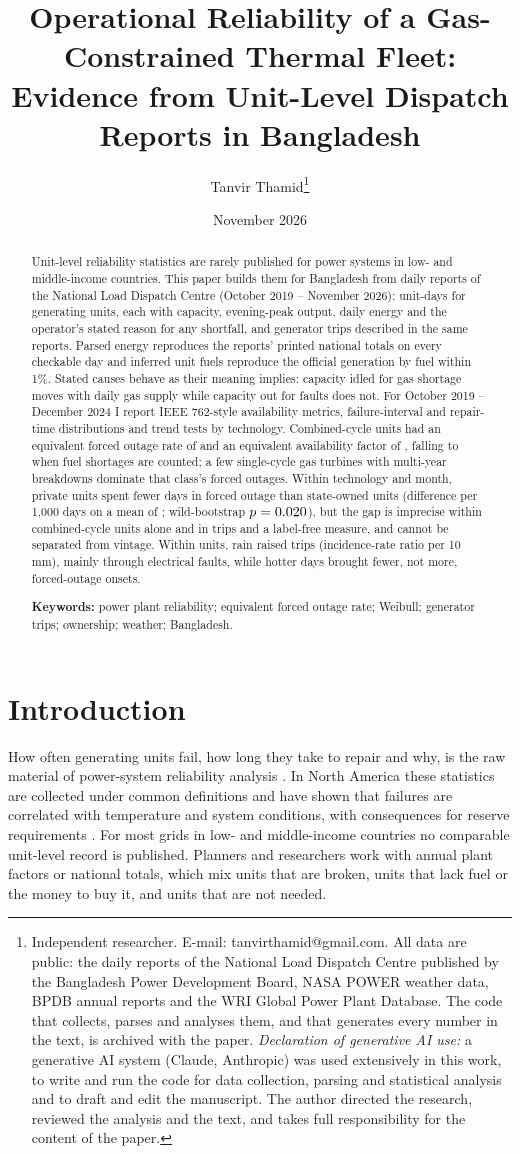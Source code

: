 \documentclass[11pt]{article}
\title{\textbf{Operational Reliability of a Gas-Constrained Thermal Fleet:\\ Evidence from Unit-Level Dispatch Reports in Bangladesh}}
\author{Tanvir Thamid\thanks{Independent researcher. E-mail: tanvirthamid@gmail.com. All data are public: the daily reports of the National Load Dispatch Centre published by the Bangladesh Power Development Board, NASA POWER weather data, BPDB annual reports and the WRI Global Power Plant Database. The code that collects, parses and analyses them, and that generates every number in the text, is archived with the paper. \emph{Declaration of generative AI use:} a generative AI system (Claude, Anthropic) was used extensively in this work, to write and run the code for data collection, parsing and statistical analysis and to draft and edit the manuscript. The author directed the research, reviewed the analysis and the text, and takes full responsibility for the content of the paper.}}
\date{November 2026}
\begin{document}
\maketitle
\begin{abstract}
\noindent Unit-level reliability statistics are rarely published for power systems in low- and middle-income countries. This paper builds them for Bangladesh from \nDays{} daily reports of the National Load Dispatch Centre (October 2019 -- November 2026): \nUnitDays{} unit-days for \nUnits{} generating units, each with capacity, evening-peak output, daily energy and the operator's stated reason for any shortfall, and \nTrips{} generator trips described in the same reports. Parsed energy reproduces the reports' printed national totals on every checkable day and inferred unit fuels reproduce the official generation by fuel within 1\%. Stated causes behave as their meaning implies: capacity idled for gas shortage moves with daily gas supply while capacity out for faults does not. For October 2019 -- December 2024 I report IEEE 762-style availability metrics, failure-interval and repair-time distributions and trend tests by technology. Combined-cycle units had an equivalent forced outage rate of \ieeeCcEFOR{} and an equivalent availability factor of \ieeeCcEAF, falling to \ieeeCcEAFomc{} when fuel shortages are counted; a few single-cycle gas turbines with multi-year breakdowns dominate that class's forced outages. Within technology and month, private units spent fewer days in forced outage than state-owned units (difference \ownForcedB{} per 1,000 days on a mean of \ownForcedMean; wild-bootstrap $p=0.020$), but the gap is imprecise within combined-cycle units alone and in trips and a label-free measure, and cannot be separated from vintage. Within units, rain raised trips (incidence-rate ratio \rainTripIRR{} per 10 mm), mainly through electrical faults, while hotter days brought fewer, not more, forced-outage onsets.

\medskip
\noindent\textbf{Keywords:} power plant reliability; equivalent forced outage rate; Weibull; generator trips; ownership; weather; Bangladesh.
\end{abstract}

\newpage
\section{Introduction}

How often generating units fail, how long they take to repair and why, is the raw material of power-system reliability analysis \citep{billinton1996reliability}. In North America these statistics are collected under common definitions \citep{ieee762} and have shown that failures are correlated with temperature and system conditions, with consequences for reserve requirements \citep{murphy2018adequacy,murphy2019timedependent,murphy2020temperature}. For most grids in low- and middle-income countries no comparable unit-level record is published. Planners and researchers work with annual plant factors or national totals, which mix units that are broken, units that lack fuel or the money to buy it, and units that are not needed.
\end{document}

